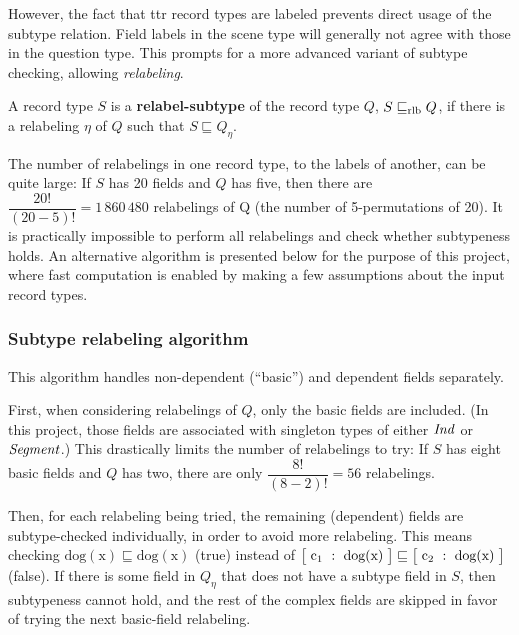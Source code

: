 However, the fact that \gls{ttr} record types are labeled prevents direct usage of the subtype relation.
Field labels in the scene type will generally not agree with those in the question type.
This prompts for a more advanced variant of subtype checking, allowing \textit{relabeling}.


\begin{definition}
A record type $S$ is a \textbf{relabel-subtype} of the record type $Q$, $S \mathrel{\sqsubseteq_\text{rlb}} Q$, if there is a relabeling $\eta$ of $Q$ such that $S \sqsubseteq Q_\eta$.

\end{definition}

The number of relabelings in one record type, to the labels of another, can be quite large:
If $S$ has 20 fields and $Q$ has five, then there are $\dfrac{20!}{(20-5)!} = 1\,860\,480$ relabelings of Q (the number of 5-permutations of 20).
It is practically impossible to perform all relabelings and check whether subtypeness holds.
An alternative algorithm is presented below for the purpose of this project, where fast computation is enabled by making a few assumptions about the input record types.



\subsubsection{Subtype relabeling algorithm}

This algorithm handles non-dependent (``basic'') and dependent fields separately.

First, when considering relabelings of $Q$, only the basic fields are included.
(In this project, those fields are associated with singleton types of either $\mathit{Ind}$ or $\mathit{Segment}$.)
This drastically limits the number of relabelings to try:
If $S$ has eight basic fields and $Q$ has two, there are only $\dfrac{8!}{(8-2)!} = 56$ relabelings.

Then, for each relabeling being tried, the remaining (dependent) fields are subtype-checked individually, in order to avoid more relabeling.
This means checking
$\text{dog}(\text{x}) \sqsubseteq \text{dog}(\text{x})$ (true) instead of
$\rec{\text{c}_1 &:& \text{dog}(\text{x})} \sqsubseteq \rec{\text{c}_2 &:& \text{dog}(\text{x})}$ (false).
If there is some field in $Q_\eta$ that does not have a subtype field in $S$, then subtypeness cannot hold, and the rest of the complex fields are skipped in favor of trying the next basic-field relabeling.

